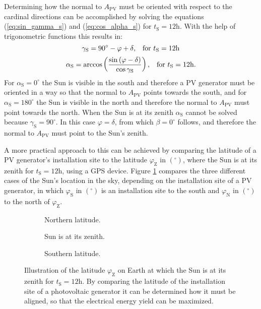 Determining how the normal to $A_{\mathrm{PV}}$ must be oriented with respect to the cardinal directions can be accomplished by solving the equations (\ref{eq:sin_gamma_s}) and (\ref{eq:cos_alpha_s}) for $t_{\mathrm{S}} = 12\mathrm{h}$. With the help of trigonometric functions this results in:
	\begin{equation} \label{eq:gamma_s_align}
	\centering
		\gamma_{\mathrm{S}} = 90^\circ - \varphi + \delta \text{,} \quad \text{for } t_{\mathrm{S}} = 12\mathrm{h}
	\end{equation}
	\begin{equation} \label{eq:alpha_s_align}
	\centering
		\alpha_{\mathrm{S}} = \arccos \left(\frac{\sin \left(\varphi - \delta\right)}{\cos \gamma_{\mathrm{S}}}\right) \text{,} \quad \text{for } t_{\mathrm{S}} = 12\mathrm{h} \text{.}
	\end{equation}
For $\alpha_{\mathrm{S}} = 0^\circ$ the Sun is visible in the south and therefore a PV generator must be oriented in a way so that the normal to $A_{\mathrm{PV}}$ points towards the south, and for $\alpha_{\mathrm{S}} = 180^\circ$ the Sun is visible in the north and therefore the normal to $A_{\mathrm{PV}}$ must point towards the north. When the Sun is at its zenith $\alpha_{\mathrm{S}}$ cannot be solved because $\gamma_{\mathrm{S}} = 90^\circ$. In this case $\varphi = \delta$, from which $\beta = 0^\circ$ follows, and therefore the normal to $A_{\mathrm{PV}}$ must point to the Sun's zenith.

A more practical approach to this can be achieved by comparing the latitude of a PV generator's installation site to the latitude $\varphi_{\mathrm{Z}}$ in $\left(^\circ\right)$, where the Sun is at its zenith for $t_{\mathrm{S}} = 12\mathrm{h}$, using a GPS device. Figure \ref{fig:crucial_latitudes} compares the three different cases of the Sun's location in the sky, depending on the installation site of a PV generator, in which $\varphi_{\mathrm{S}}$ in $\left(^\circ\right)$ is an installation site to the south and $\varphi_{\mathrm{N}}$ in $\left(^\circ\right)$ to the north of $\varphi_{\mathrm{Z}}$.

\begin{figure}[h!]
	\centering
		\begin{subfigure}[b]{0.3\linewidth}
			
			\caption{Northern latitude.}
		\end{subfigure}
		\begin{subfigure}[b]{0.3\linewidth}
			
			\caption{Sun is at its zenith.}
		\end{subfigure}
		\begin{subfigure}[b]{0.3\linewidth}
			
			\caption{Southern latitude.}
		\end{subfigure}
	\caption{Illustration of the latitude $\varphi_{\mathrm{Z}}$ on Earth at which the Sun is at its zenith for $t_{\mathrm{S}} = 12\mathrm{h}$. By comparing the latitude of the installation site of a photovoltaic generator it can be determined how it must be aligned, so that the electrical energy yield can be maximized.}
	\label{fig:crucial_latitudes}
\end{figure}

